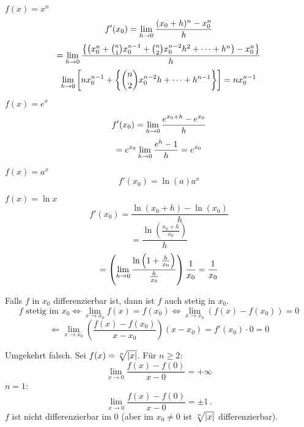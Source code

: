 \begin{Bsp}
  $f(x)=x^n$
  \[f'(x_0)=\displaystyle\lim_{h\rightarrow0}\frac{(x_0+h)^n-x_0^n}{h}\]
\[=\displaystyle\lim_{h\rightarrow0}\frac{\left\{ \left( x_0^n+\binom{n}{1}x_0^{n-1}+\binom{n}{2}x_0^{n-2}h^2+\cdots + h^n \right)-x_0^n \right\}}{h}\]
  \[\displaystyle\lim_{h\rightarrow0}\left[ nx_0^{n-1}+\left\{ \binom{n}{2}x_0^{n-2}h+\cdots+h^{n-1} \right\} \right]=nx_0^{n-1}\]
\end{Bsp}
\begin{Bsp}
  $f(x)=e^x$
  \[f'(x_0)=\displaystyle\lim_{h\rightarrow0}\frac{e^{x_0+h}-e^{x_0}}{h}\]
  \[=e^{x_0}\displaystyle\lim_{h\rightarrow0}\frac{e^h-1}{h}=e^{x_0}\]
\end{Bsp}
\begin{Ueb}
  $f(x)=a^x$
  \[f'(x_0)=\ln(a) a^x\]
\end{Ueb}
\begin{Bsp}
  $f(x)=\ln x$
  \[f'(x_0)=\frac{\ln(x_0+h)-\ln(x_0)}{h}\]
  \[=\frac{\ln\left( \frac{x_0+h}{x_0} \right)}{h}\]
  \[=\left( \displaystyle\lim_{h\rightarrow0}\frac{\ln\left( 1+\frac{h}{x_0} \right)}{\frac{h}{x_0}} \right)\frac{1}{x_0}
=\frac{1}{x_0}\]
\end{Bsp}
\begin{Bem}
  Falls $f$ in $x_0$ differenzierbar ist, dann ist $f$ auch stetig in $x_0$.
  \[f \mbox{ stetig im } x_0\iff\lim_{x\to x_0}f(x)=f(x_0)\iff\lim_{x\to x_0}\left( f(x)-f(x_0) \right)=0\]
  \[\Leftarrow\lim_{x\to x_0}\left( \frac{f(x)-f(x_0)}{x-x_0} \right)(x-x_0)=f'(x_0)
\cdot  0=0\]
\end{Bem}
\begin{Bem}
  Umgekehrt falsch. Sei $f(x)=\sqrt[n]{\mathopen| x \mathclose|}$.
  F\"ur $n\geq 2$:
  \[\lim_{x\to 0}\frac{f(x)-f(0)}{x-0}=+\infty\]
  $n=1$:
  \[\lim_{x\to 0}\frac{f(x)-f(0)}{x-0}=\pm1\, .\]
$f$ ist nicht differenzierbar im $0$ 
(aber im $x_0\neq 0$ ist $\sqrt[n]{\mathopen| x \mathclose|}$ differenzierbar).
\end{Bem}
